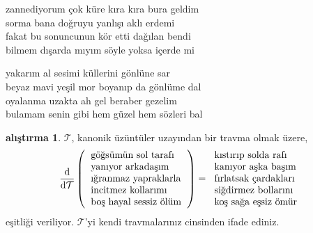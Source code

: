 \documentclass[10pt, openright, oneside]{memoir}
\theoremstyle{definition}
\newtheorem*{alistirma}{alıştırma}
\begin{document}
\settowidth{\versewidth}{zannediyorum çok küre kıra kıra bura geldim}
\begin{cverse}
  zannediyorum çok küre kıra kıra bura geldim \\
  sorma bana doğruyu yanlışı aklı erdemi \\
  fakat bu sonuncunun kör etti dağılan bendi \\
  bilmem dışarda mıyım söyle yoksa içerde mi
\end{cverse}
\vspace*{\fill}
%
\newpage
{}
\vspace*{\fill}
\settowidth{\versewidth}{bulamam senin gibi hem güzel hem sözleri bal}
\begin{cverse}
  yakarım al sesimi küllerini gönlüne sar \\
  beyaz mavi yeşil mor boyanıp da gönlüme dal \\
  oyalanma uzakta ah gel beraber gezelim \\
  bulamam senin gibi hem güzel hem sözleri bal
\end{cverse}
\vspace*{\fill}
%
\newpage
{}
\vspace*{\fill}
\begin{alistirma}
  \(\mathcal{T}\), kanonik üzüntüler uzayından bir travma olmak üzere,
  \[
    \dv{\mathcal{T}}
    \left(
      \begin{tabular}{l}
        göğsümün sol tarafı \\
        yanıyor arkadaşım \\
        ığranmaz yapraklarla \\
        incitmez kollarımı \\
        boş hayal sessiz ölüm
      \end{tabular}
    \right)
    =
    \begin{tabular}{l}
      kıstırıp solda rafı \\
      kanıyor aşka başım \\
      fırlatsak çardakları \\
      siğdirmez bollarını \\
      koş sağa eşsiz ömür
    \end{tabular}
  \]
  eşitliği veriliyor. $\mathcal{T}$'yi kendi travmalarınız cinsinden ifade
  ediniz.
\end{alistirma}
\vspace*{\fill}
\end{document}
